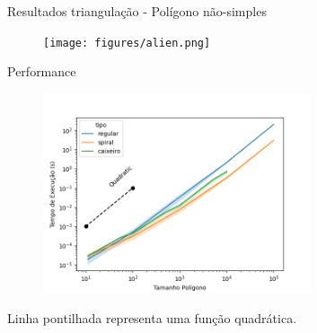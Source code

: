 \documentclass[aspectratio=169,usenames,dvipsnames]{beamer}
\begin{document}
\begin{frame}{Resultados triangulação - Polígono não-simples}
    \begin{center}
      \begin{figure}
        \texttt{[image: figures/alien.png]}
      \end{figure}
    \end{center}
\end{frame}

\begin{frame}{Performance}
  \begin{figure}
    \includegraphics[width=0.7\textwidth]{figures/performance.png}
  \end{figure}
  \begin{center}
  Linha pontilhada representa uma função quadrática.
  \end{center}
\end{frame}
\end{document}
